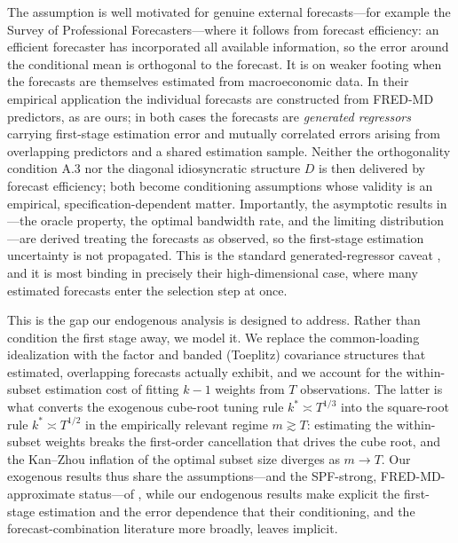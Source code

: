 The assumption is well motivated for genuine external forecasts---for example the Survey of
Professional Forecasters---where it follows from forecast efficiency: an efficient
forecaster has incorporated all available information, so the error around the conditional
mean is orthogonal to the forecast. It is on weaker footing when the forecasts are
themselves estimated from macroeconomic data. In their empirical application the individual
forecasts are constructed from FRED-MD predictors, as are ours; in both cases the forecasts
are \emph{generated regressors} carrying first-stage estimation error and mutually
correlated errors arising from overlapping predictors and a shared estimation sample.
Neither the orthogonality condition A.3 nor the diagonal idiosyncratic structure $D$ is then
delivered by forecast efficiency; both become conditioning assumptions whose validity is an
empirical, specification-dependent matter. Importantly, the asymptotic results in
\citet{ChenMaung2023}---the oracle property, the optimal bandwidth rate, and the limiting
distribution---are derived treating the forecasts as observed, so the first-stage estimation
uncertainty is not propagated. This is the standard generated-regressor caveat
\citep{Pagan1984}, and it is most binding in precisely their high-dimensional case, where
many estimated forecasts enter the selection step at once.

This is the gap our endogenous analysis is designed to address. Rather than condition the
first stage away, we model it. We replace the common-loading idealization with the factor
and banded (Toeplitz) covariance structures that estimated, overlapping forecasts actually
exhibit, and we account for the within-subset estimation cost of fitting $k-1$ weights from
$T$ observations. The latter is what converts the exogenous cube-root tuning rule
$k^\ast\asymp T^{1/3}$ into the square-root rule $k^\ast\asymp T^{1/2}$ in the empirically
relevant regime $m\gtrsim T$: estimating the within-subset weights breaks the first-order
cancellation that drives the cube root, and the Kan--Zhou inflation of the optimal subset
size diverges as $m\to T$. Our exogenous results thus share the assumptions---and the
SPF-strong, FRED-MD-approximate status---of \citet{ChenMaung2023}, while our endogenous
results make explicit the first-stage estimation and the error dependence that their
conditioning, and the forecast-combination literature more broadly, leaves implicit.

%
